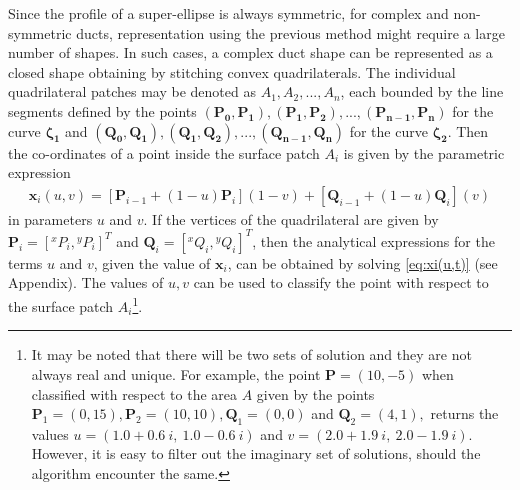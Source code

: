 \documentclass[12pt,a4]{article}
\begin{document}
Since the profile of a super-ellipse is always symmetric, for complex and non-symmetric ducts, representation using the previous method might require a large number of shapes. In such cases, a complex duct shape can be represented as a closed shape obtaining by stitching convex quadrilaterals. The individual quadrilateral patches may be denoted as $A_1,A_2,...,A_n$, each bounded by the line segments defined by the points $\mathbf{(P_0,P_1),(P_1,P_2),...,(P_{n-1},P_n)}$ for the curve $\mathbf{\zeta_1}$ and $\mathbf{(Q_0,Q_1),(Q_1,Q_2),...,(Q_{n-1},Q_n)}$ for the curve $\mathbf{\zeta_2}$. Then the co-ordinates of a point inside the surface patch $A_i$ is given by the parametric expression
\begin{align}
\label{eq:xi(u,t)}
\mathbf{x}_i(u,v)= \left[ \mathbf{P}_{i-1}+\left(1-{u} \right)\mathbf{P}_i  \right]\left(1-{v}\right) +\left[\mathbf{ Q}_{i-1}+\left(1-{u} \right)\mathbf{Q}_i  \right]\left({v}\right)
\end{align}
in parameters $u$ and $v$. If the vertices of the quadrilateral are given by $\mathbf{P}_{i}=\left[ {}^xP_{i},{}^yP_{i}\right]^T $ and $\mathbf{Q}_{i}=\left[ {}^xQ_{i},{}^yQ_{i}\right]^T $, then the analytical expressions for the terms $u$ and ${v}$, given the value of $\mathbf{x}_i$, can be obtained by solving \ref{eq:xi(u,t)} (see Appendix). The values of $u,v$ can be used to classify the point with respect to the surface patch $A_i$\footnote{It may be noted that there will be two sets of solution and they are not always real and unique. For example, the point $\mathbf{P} =\left(10,-5 \right)$ when classified with respect to the area $A$ given by the points $\mathbf{P}_1 = \left(0,15 \right),\mathbf{P}_2 = \left(10,10 \right),\mathbf{Q}_1 = \left(0,0 \right)$ and $\mathbf{Q}_2 = \left(4,1 \right),$ returns the values $u=\left( 1.0 + 0.6~i,~1.0 - 0.6~i \right)$ and $v=\left(2.0 + 1.9~i,~2.0 - 1.9~i\right)$. However, it is easy to filter out the imaginary set of solutions, should the algorithm encounter the same.}.
\end{document}
